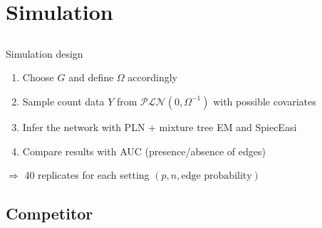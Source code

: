 \documentclass[9pt]{beamer}
\newcommand{\emphase}[1]{\textcolor{Complement}{#1}}
\begin{document}
\section{Simulation}


\subsection{}

\begin{frame}{Simulation design}

\begin{enumerate}
     \item Choose  \emphase{$G$} and define  \emphase{$\Omega$} accordingly\vspace{0.3cm} 
     \item Sample count data \emphase{$Y$} from $\mathcal{PLN}(0,\Omega^{-1})$ with possible covariates
     \item Infer the network with \emphase{PLN + mixture tree EM}  and \emphase{SpiecEasi} \vspace{0.3cm}
     \item Compare results with \emphase{AUC} (presence/absence of edges)
\end{enumerate}\bigskip\bigskip
\hspace{1cm}$\Rightarrow$ 40 replicates for each setting $(p, n, \text{edge probability})$
	
\end{frame}

\subsection{Competitor}
\end{document}
